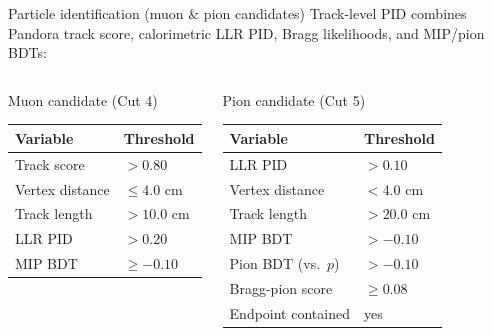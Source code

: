 \documentclass[aspectratio=169,10pt]{beamer}
\begin{document}
\begin{frame}{Particle identification (muon \& pion candidates)}
  \footnotesize
  Track-level PID combines Pandora track score, calorimetric LLR PID, Bragg likelihoods, and MIP/pion BDTs:
  \begin{columns}[T]
  \begin{block}{Muon candidate (Cut 4)}\scriptsize
  \begin{tabular}{ll}
  \toprule Variable & Threshold\\\midrule
  Track score & $>0.80$\\
  Vertex distance & $\le4.0$ cm\\
  Track length & $>10.0$ cm\\
  LLR PID & $>0.20$\\
  MIP BDT & $\ge-0.10$\\
  \bottomrule
  \end{tabular}
  \end{block}
  \begin{block}{Pion candidate (Cut 5)}\scriptsize
  \begin{tabular}{ll}
  \toprule Variable & Threshold\\\midrule
  LLR PID & $>0.10$\\
  Vertex distance & $<4.0$ cm\\
  Track length & $>20.0$ cm\\
  MIP BDT & $>-0.10$\\
  Pion BDT (vs.\ $p$) & $>-0.10$\\
  Bragg-pion score & $\ge0.08$\\
  Endpoint contained & yes\\
  \bottomrule
  \end{tabular}
  \end{block}
  \end{columns}
  \vspace{1mm}
\end{frame}
\end{document}
